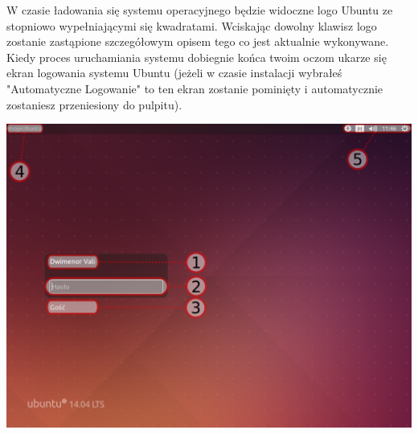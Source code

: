 W czasie ładowania się systemu operacyjnego będzie widoczne logo Ubuntu ze stopniowo wypełniającymi się kwadratami. Wciskając dowolny klawisz logo zostanie zastąpione szczegółowym opisem tego co jest aktualnie wykonywane.
Kiedy proces uruchamiania systemu dobiegnie końca twoim oczom ukarze się ekran logowania systemu Ubuntu (jeżeli w czasie instalacji wybrałeś "Automatyczne Logowanie" to ten ekran zostanie pominięty i automatycznie zostaniesz przeniesiony do pulpitu).
\begin{center}
        \includegraphics[scale=0.5]{images/greater.png}
\end{center}

